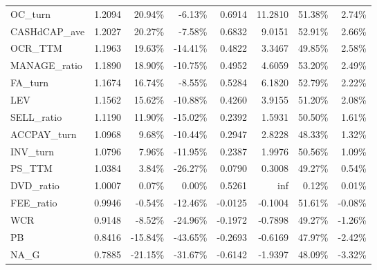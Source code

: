 \documentclass[11pt]{article}
\begin{document}
\begin{table}[htbp]
\begin{tabular}{lrrrrrrr}
    OC\_turn & 1.2094  & 20.94\% & -6.13\% & 0.6914  & 11.2810  & 51.38\% & 2.74\% \\
    CASHdCAP\_ave & 1.2027  & 20.27\% & -7.58\% & 0.6832  & 9.0151  & 52.91\% & 2.66\% \\
    OCR\_TTM & 1.1963  & 19.63\% & -14.41\% & 0.4822  & 3.3467  & 49.85\% & 2.58\% \\
    MANAGE\_ratio & 1.1890  & 18.90\% & -10.75\% & 0.4952  & 4.6059  & 53.20\% & 2.49\% \\
    FA\_turn & 1.1674  & 16.74\% & -8.55\% & 0.5284  & 6.1820  & 52.79\% & 2.22\% \\
    LEV   & 1.1562  & 15.62\% & -10.88\% & 0.4260  & 3.9155  & 51.20\% & 2.08\% \\
    SELL\_ratio & 1.1190  & 11.90\% & -15.02\% & 0.2392  & 1.5931  & 50.50\% & 1.61\% \\
    ACCPAY\_turn & 1.0968  & 9.68\% & -10.44\% & 0.2947  & 2.8228  & 48.33\% & 1.32\% \\
    INV\_turn & 1.0796  & 7.96\% & -11.95\% & 0.2387  & 1.9976  & 50.56\% & 1.09\% \\
    PS\_TTM & 1.0384  & 3.84\% & -26.27\% & 0.0790  & 0.3008  & 49.27\% & 0.54\% \\
    DVD\_ratio & 1.0007  & 0.07\% & 0.00\% & 0.5261  & \multicolumn{1}{r}{inf} & 0.12\% & 0.01\% \\
    FEE\_ratio & 0.9946  & -0.54\% & -12.46\% & -0.0125  & -0.1004  & 51.61\% & -0.08\% \\
    WCR   & 0.9148  & -8.52\% & -24.96\% & -0.1972  & -0.7898  & 49.27\% & -1.26\% \\
    PB    & 0.8416  & -15.84\% & -43.65\% & -0.2693  & -0.6169  & 47.97\% & -2.42\% \\
    NA\_G & 0.7885  & -21.15\% & -31.67\% & -0.6142  & -1.9397  & 48.09\% & -3.32\% \\
    \bottomrule
    \end{tabular}%
  \label{tab:raw factor}%
\end{table}%
\end{document}
